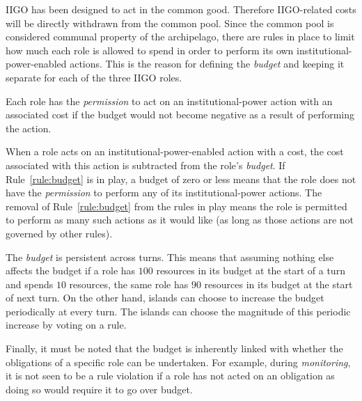 IIGO has been designed to act in the common good. Therefore IIGO-related costs will be directly withdrawn from the common pool. Since the common pool is considered communal property of the archipelago, there are rules in place to limit how much each role is allowed to spend in order to perform its own institutional-power-enabled actions. This is the reason for defining the \emph{budget} and keeping it separate for each of the three IIGO roles.

\begin{rule_IIGO} \label{rule:budget}
    Each role has the \emph{permission} to act on an institutional-power action with an associated cost if the budget would not become negative as a result of performing the action.
 \end{rule_IIGO}



When a role acts on an institutional-power-enabled action with a cost, the cost associated with this action is subtracted from the role's \emph{budget}. If Rule~\ref{rule:budget} is in play, a budget of zero or less means that the role does not have the \emph{permission} to perform any of its institutional-power actions. The removal of Rule~\ref{rule:budget} from the rules in play means the role is permitted to perform as many such actions as it would like (as long as those actions are not governed by other rules).

The \emph{budget} is persistent across turns. This means that assuming nothing else affects the budget if a role has $100$ resources in its budget at the start of a turn and spends $10$ resources, the same role has $90$ resources in its budget at the start of next turn. On the other hand, islands can choose to increase the budget periodically at every turn. The islands can choose the magnitude of this periodic increase by voting on a rule.


Finally, it must be noted that the budget is inherently linked with  whether the obligations of a specific role can be undertaken.
For example, during \emph{monitoring}, it is not seen to be a rule violation if a role has not acted on an obligation as doing so would require it to go over budget.


